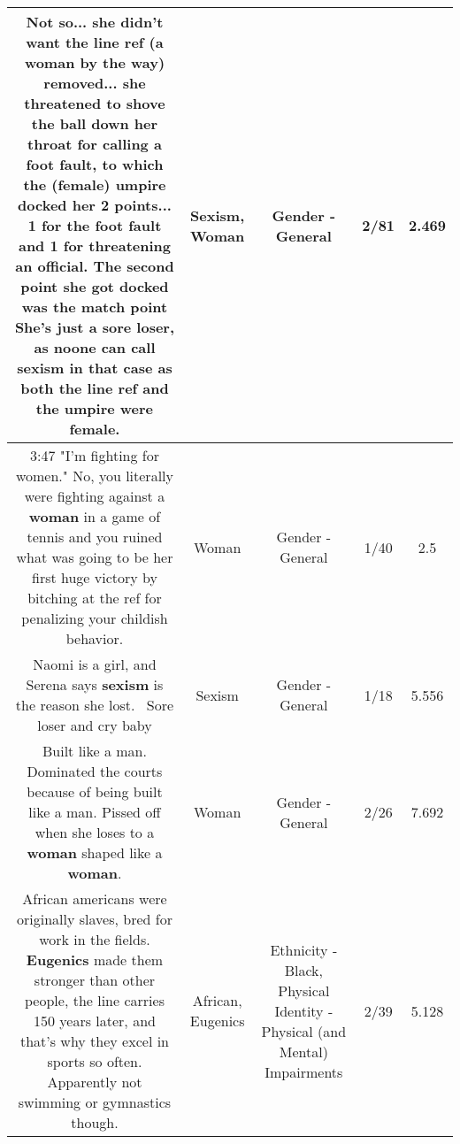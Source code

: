 \documentclass[11pt]{article}
\newlength\mylength
\begin{document}
\begin{center}
\begin{longtable}{|C{.65\mylength}|C{.30\mylength}|C{.12\mylength}|C{.12\mylength}|C{.12\mylength}|}
  \small Not so... she didn't want the line ref (a \textbf{woman} by the way) removed... she threatened to shove the ball down her throat for calling a foot fault, to which the (female) umpire docked her 2 points... 1 for the foot fault and 1 for threatening an official.   The second point she got docked was the match point    She's just a sore loser, as noone can call \textbf{sexism} in that case as both the line ref and the umpire were female.\normalsize   & Sexism, Woman & Gender - General & 2/81 & 2.469 \\  \hline
  \small 3:47 "I'm fighting for women." No, you literally were fighting against a \textbf{woman} in a game of tennis and you ruined what was going to be her first huge victory by bitching at the ref for penalizing your childish behavior.\normalsize   & Woman & Gender - General & 1/40 & 2.5 \\  \hline
  \small Naomi is a girl, and Serena says \textbf{sexism} is the reason she lost.🤦‍♀️😅Sore loser and cry baby\normalsize   & Sexism & Gender - General & 1/18 & 5.556 \\  \hline
  \small Built like a man. Dominated the courts because of being built like a man. Pissed off when she loses to a \textbf{woman} shaped like a \textbf{woman}.\normalsize   & Woman & Gender - General & 2/26 & 7.692 \\  \hline
  \small African americans were originally slaves, bred for work in the fields.  \textbf{Eugenics} made them stronger than other people, the line carries 150 years later, and that's why they excel in sports so often.  Apparently not swimming or gymnastics though.\normalsize   & African, Eugenics & Ethnicity - Black, Physical Identity - Physical (and Mental) Impairments & 2/39 & 5.128 \\  \hline

\end{longtable}
\end{center}
\end{document}
